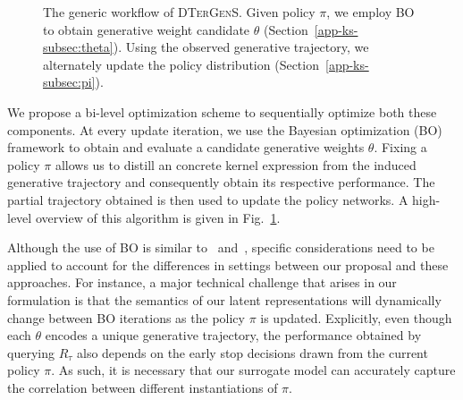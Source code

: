 \begin{figure}
\centering
{}
\caption{The generic workflow of \textsc{DTerGenS}. Given policy $\pi$, we employ BO to obtain generative weight candidate $\theta$ (Section~\ref{app-ks-subsec:theta}). Using the observed generative trajectory, we alternately update the policy distribution (Section~\ref{app-ks-subsec:pi}).}
\label{c3-fig:workflow}
\end{figure}

We propose a bi-level optimization scheme to sequentially optimize both these components. At every update iteration, we use the Bayesian optimization (BO) framework to obtain and evaluate a candidate generative weights $\theta$. Fixing a policy $\pi$ allows us to distill an concrete kernel expression from the induced generative trajectory and consequently obtain its respective performance. The partial trajectory obtained is then used to update the policy networks. A high-level overview of this algorithm is given in Fig.~\ref{c3-fig:workflow}. 

Although the use of BO is similar to~\citet{Lu18} and~\citet{Malkomes16}, specific considerations need to be applied to account for the differences in settings between our proposal and these approaches. For instance, a major technical challenge that arises in our formulation is that the semantics of our latent representations will dynamically change between BO iterations as the policy $\pi$ is updated. Explicitly, even though each $\theta$ encodes a unique generative trajectory, the performance obtained by querying $R_\tau$ also depends on the early stop decisions drawn from the current policy $\pi$. As such, it is necessary that our surrogate model can accurately capture the correlation between different instantiations of $\pi$.

